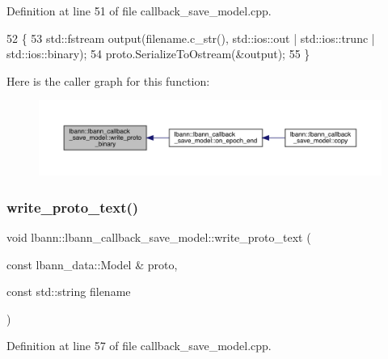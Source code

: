Definition at line 51 of file callback\+\_\+save\+\_\+model.\+cpp.


\begin{DoxyCode}
52                                                                              \{
53   std::fstream output(filename.c\_str(), std::ios::out | std::ios::trunc | std::ios::binary);
54   proto.SerializeToOstream(&output);
55 \}
\end{DoxyCode}
Here is the caller graph for this function\+:\nopagebreak
\begin{figure}[H]
\begin{center}
\leavevmode
\includegraphics[width=350pt]{classlbann_1_1lbann__callback__save__model_a3c06fcc91890d4fe51a07672152b91a5_icgraph}
\end{center}
\end{figure}
\mbox{\label{classlbann_1_1lbann__callback__save__model_a9dd2617a12810287c4f5cb87746e71ea}} 
\subsubsection{\texorpdfstring{write\+\_\+proto\+\_\+text()}{write\_proto\_text()}}
{\footnotesize\ttfamily void lbann\+::lbann\+\_\+callback\+\_\+save\+\_\+model\+::write\+\_\+proto\+\_\+text (\begin{DoxyParamCaption}\item[{const lbann\+\_\+data\+::\+Model \&}]{proto,  }\item[{const std\+::string}]{filename }\end{DoxyParamCaption})\hspace{0.3cm}{\ttfamily [private]}}



Definition at line 57 of file callback\+\_\+save\+\_\+model.\+cpp.


